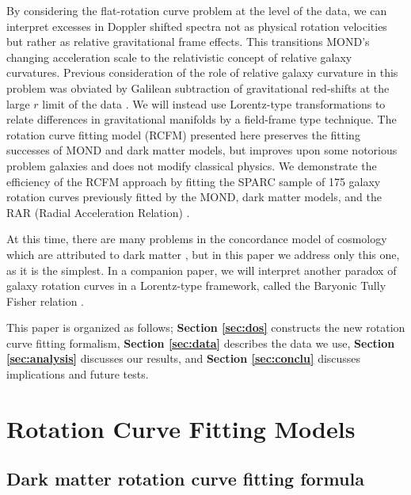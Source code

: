 \documentclass[reprint,%
 amsmath,amssymb,
 aps,
]{revtex4-1}
\begin{document}
By considering the flat-rotation curve problem at the level of the data, we can interpret excesses in Doppler shifted spectra not as physical rotation velocities but rather as relative gravitational frame effects.  This transitions   MOND's  changing acceleration scale to the relativistic concept of    relative galaxy  curvatures. Previous consideration of the role of relative
     galaxy curvature  in this problem was obviated 
       by  Galilean subtraction of   gravitational red-shifts at the  large $r$  limit of the data \citep{MTW}. We will instead use Lorentz-type transformations to relate differences in gravitational manifolds by a field-frame type technique. 
The rotation curve fitting model (RCFM)  presented here    preserves the fitting successes of MOND and dark matter models, but   improves upon   some notorious problem galaxies and does not modify classical physics.   We demonstrate     the efficiency of the RCFM approach by fitting   the SPARC sample of 175 galaxy rotation curves  previously   fitted by the MOND, dark matter models, and the    RAR (Radial Acceleration Relation) \cite{McGaugh2016RAR,2016Lelli,McGaugh_2014,Li_2018}. 


    At this time, there are many problems in   the concordance model of   cosmology which are attributed to dark matter \cite{2010dmp..book.....S,Tully:2014gfa,Naidu_2022}, but in
 this paper we address only this  one, as it is the simplest. In a companion paper,  we will interpret another paradox of galaxy rotation curves  in a Lorentz-type framework, called the Baryonic Tully Fisher relation \citet{1977A&A....54..661T}.

 
 This paper  is organized as follows;
{\bf Section \ref{sec:dos}} constructs  the new rotation curve  fitting formalism, 
{\bf Section \ref{sec:data}}   describes  the data  we use, 
 {\bf Section \ref{sec:analysis}}   discusses our results, 
 and  {\bf Section \ref{sec:conclu}}   discusses implications and future tests.   
  

  
    

\section{ Rotation Curve Fitting Models  \label{sec:dos}}
 
 
 \subsection{Dark matter rotation curve fitting formula}
 
\end{document}
